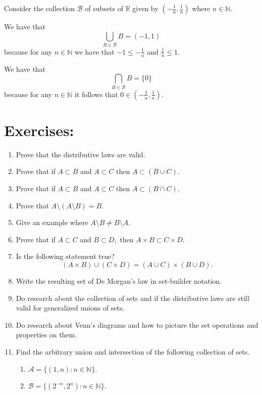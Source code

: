\documentclass[
	fontsize=10pt, %
	twoside=false, %
	secnumdepth=1, %
]{kaobook}
\begin{document}
\begin{example}
Consider the collection $\mathcal{B}$ of subsets of $\mathbb{R}$ given by $\left(-\frac{1}{n},\frac{1}{n}\right)$ where $n\in\mathbb{N}.$

We have that $$\bigcup_{B\in\mathcal{B}}B =(-1,1)$$ because for any $n\in \mathbb{N}$ we have that $-1\leq -\frac{1}{n}$ and $\frac{1}{n}\leq 1.$

We have that $$\bigcap_{B\in\mathcal{B}} B= \{0\}$$ because for any $n\in\mathbb{N}$ it follows that $0\in \left(-\frac{1}{n},\frac{1}{n}\right).$
\end{example}
\section{Exercises:}

\begin{enumerate}
\item Prove that the distributive laws are valid. 

\item Prove that if $A\subset B$ and $A\subset C$ then $A\subset (B\cup C).$

\item Prove that if $A\subset B$ and $A\subset C$ then $A\subset (B\cap C).$

\item Prove that $A\setminus (A\setminus B)= B.$

\item Give an example where $A\setminus B \neq B\setminus A.$

\item Prove that if $A\subset C$ and $B\subset D,$ then $A\times B \subset C\times D.$

\item Is the following statement true? $$(A\times B)\cup (C\times D)=(A\cup C)\times (B\cup D).$$

\item Write the resulting set of De Morgan's law in set-builder notation.

\item Do research about the collection of sets and if the distributive laws are still valid for generalized unions of sets.

\item Do research about Venn's diagrams and how to picture the set operations and properties on them.

\item Find the arbitrary union and intersection of the following collection of sets.
\begin{enumerate}
\item $\mathcal{A}=\{(1,n): n\in \mathbb{N}\}.$
\item $\mathcal{B}=\{(2^{-n},2^{n}):n\in \mathbb{N}\}.$
\end{enumerate}
\end{enumerate}
\end{document}
